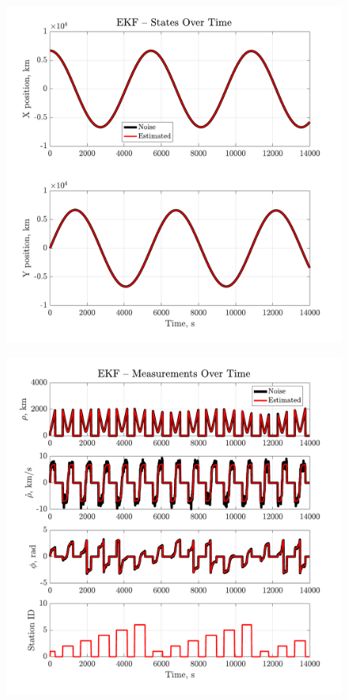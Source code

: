 \documentclass[a4paper]{aiaa-tc}
\begin{document}
  \begin{figure}[H]
 \centering
 \includegraphics[width=\textwidth]{Figures/EKF_states.pdf}
 \end{figure}
 
  \begin{figure}[H]
 \centering
 \includegraphics[width=\textwidth]{Figures/EKF_measurements.pdf}
 \end{figure}
 
\end{document}
